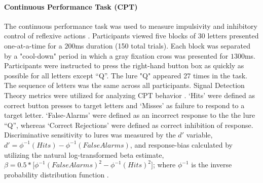 \documentclass{article}%
\begin{document}
\paragraph*{Continuous Performance Task (CPT)} The continuous performance task was used to measure impulsivity and inhibitory control of reflexive actions \citep{horn2003response}.  Participants viewed five blocks of $30$ letters presented one-at-a-time for a $200$ms duration (150 total trials). Each block was separated by a "cool-down" period in which a gray fixation cross was presented for $1300$ms. Participants were instructed to press the right-hand button box as quickly as possible for all letters except “Q”. The lure "Q" appeared 27 times in the task. The sequence of letters was the same across all participants.  Signal Detection Theory metrics were utilized for analyzing CPT behavior \cite{stanislaw1999calculation}. `Hits' were defined as correct button presses to target letters and `Misses' as failure to respond to a target letter. `False-Alarms' were defined as an incorrect response to the the lure ``Q'', whereas `Correct Rejections' were defined as correct inhibition of response. Discriminative sensitivity to lures was measured by the $d'$ variable, $d'=\phi^{-1}( Hits ) - \phi^{-1}( False Alarms )$, and response-bias calculated by utilizing the natural log-transformed beta estimate, $ \beta = 0.5*\Big[\phi^{-1}(FalseAlarms)^{2} - \phi^{-1}(Hits)^{2}\Big]$; where $\phi^{-1}$ is the inverse probability distribution function  \citep{forbes2011statistical}. 
\end{document}
